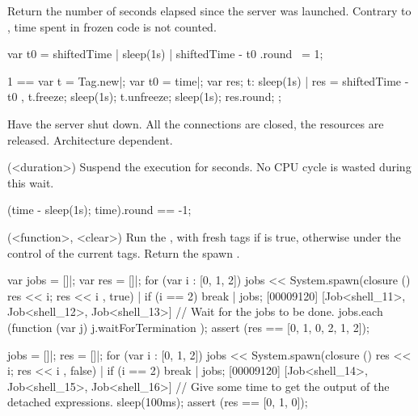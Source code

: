 \begin{urbiscriptapi}
\item[shiftedTime] Return the number of seconds elapsed since the
  \urbi server was launched.  Contrary to ,
  time spent in frozen code is not counted.
\begin{urbiassert}
{ var t0 = shiftedTime | sleep(1s) | shiftedTime - t0 }.round ~= 1;

  1 ==
  {
    var t = Tag.new|;
    var t0 = time|;
    var res;
    t: { sleep(1s) | res = shiftedTime - t0 },
    t.freeze;
    sleep(1s);
    t.unfreeze;
    sleep(1s);
    res.round;
  };
\end{urbiassert}


\item[shutdown] Have the \urbi server shut down.  All the connections
  are closed, the resources are released.  Architecture dependent.


\item[sleep](<duration>)%
  Suspend the execution for  seconds.  No CPU cycle is
  wasted during this wait.

\begin{urbiassert}
(time - {sleep(1s); time}).round == -1;
\end{urbiassert}


\item[spawn](<function>, <clear>)%
  Run the , with fresh tags if  is true, otherwise
  under the control of the current tags.  Return the spawn .
\begin{urbiscript}
var jobs = []|;
var res = []|;
for (var i : [0, 1, 2])
{
  jobs << System.spawn(closure () { res << i; res << i },
                       true) |
  if (i == 2)
    break
}|
jobs;
[00009120] [Job<shell_11>, Job<shell_12>, Job<shell_13>]
// Wait for the jobs to be done.
jobs.each (function (var j) { j.waitForTermination });
assert (res == [0, 1, 0, 2, 1, 2]);
\end{urbiscript}

\begin{urbiscript}
jobs = []|;
res = []|;
for (var i : [0, 1, 2])
{
  jobs << System.spawn(closure () { res << i; res << i },
                       false) |
  if (i == 2)
    break
}|
jobs;
[00009120] [Job<shell_14>, Job<shell_15>, Job<shell_16>]
// Give some time to get the output of the detached expressions.
sleep(100ms);
assert (res == [0, 1, 0]);
\end{urbiscript}




\end{urbiscriptapi}
